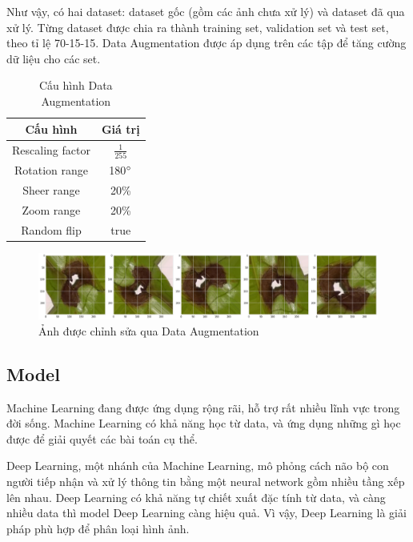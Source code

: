 \documentclass[a4paper,14pt]{extarticle}
\begin{document}
	Như vậy, có hai dataset: dataset gốc (gồm các ảnh chưa xử lý) và dataset đã qua xử lý. Từng dataset được chia ra thành training set, validation set và test set, theo tỉ lệ 70-15-15. Data Augmentation được áp dụng trên các tập để tăng cường dữ liệu cho các set.

	\begin{table}[H]
		\centering
		\renewcommand{\arraystretch}{1.2}
		\begin{tabular}{|c|c|}
		\hline
		Cấu hình         & Giá trị         \\ \hline
		Rescaling factor & $\frac{1}{255}$ \\ \hline
		Rotation range   & 180$\degree$    \\ \hline
		Sheer range      & 20\%            \\ \hline
		Zoom range       & 20\%            \\ \hline
		Random flip      & true            \\ \hline
		\end{tabular}

		\caption{Cấu hình Data Augmentation}
	\end{table}

	\begin{figure}[H]
		\centering
		\includegraphics[scale=0.25]{images/image2}
		\caption{Ảnh được chỉnh sửa qua Data Augmentation}
	\end{figure}

	\subsection{Model}
	Machine Learning đang được ứng dụng rộng rãi, hỗ trợ rất nhiều lĩnh vực trong đời sống. Machine Learning có khả năng học từ data, và ứng dụng những gì học được để giải quyết các bài toán cụ thể.

	Deep Learning, một nhánh của Machine Learning, mô phỏng cách não bộ con người tiếp nhận và xử lý thông tin bằng một neural network gồm nhiều tầng xếp lên nhau. Deep Learning có khả năng tự chiết xuất đặc tính từ data, và càng nhiều data thì model Deep Learning càng hiệu quả. Vì vậy, Deep Learning là giải pháp phù hợp để phân loại hình ảnh.
\end{document}
